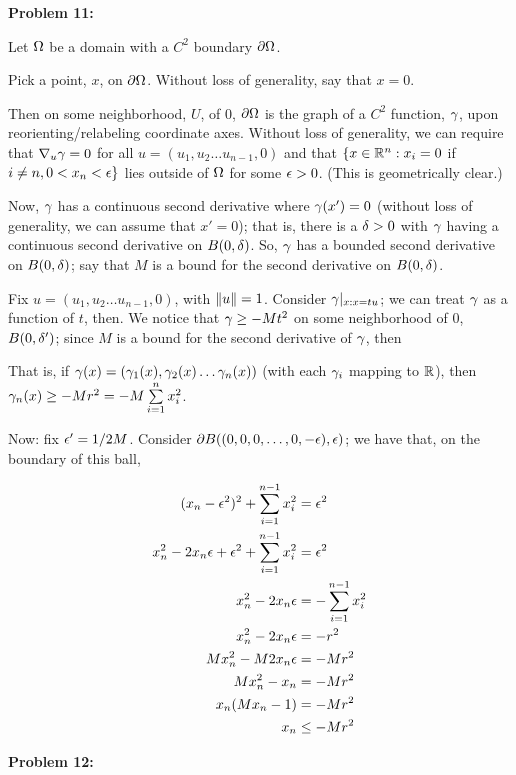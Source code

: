 \documentclass[a4paper,12pt]{article}
\begin{document}
{\bf Problem 11:} %

Let $\Omega$ be a domain with a $C^2$ boundary $\partial \Omega$.

Pick a point, $x$, on $\partial \Omega$. Without loss of generality, say that $x = 0$.

Then on some neighborhood, $U$, of $0$, $\partial \Omega$ is the graph of a $C^2$ function, $\gamma$, upon reorienting/relabeling coordinate axes. Without loss of generality, we can require that $\nabla_u \gamma = 0$ for all $u= (u_1,u_2 \ldots u_{n-1},0)$ and that $\{x \in \mathbb{R}^n: x_i = 0$ if $i \neq n, 0<x_n<\epsilon\}$ lies outside of $\Omega$ for some $\epsilon>0$. (This is geometrically clear.) 

Now, $\gamma$ has a continuous second derivative where $\gamma(x') = 0$ (without loss of generality, we can assume that $x'=0$); that is, there is a $\delta>0$ with $\gamma$ having a continuous second derivative on $B(0,\delta)$. So, $\gamma$ has a bounded second derivative on $B(0,\delta)$; say that $M$ is a bound for the second derivative on $B(0,\delta)$.

Fix $u= (u_1,u_2 \ldots u_{n-1},0)$, with $\|u\| = 1$. Consider $\gamma \vert_{x: x = tu}$; we can treat $\gamma$ as a function of $t$, then. We notice that $\gamma \geq -Mt^2$ on some neighborhood of $0$, $B(0, \delta')$; since $M$ is a bound for the second derivative of $\gamma$, then %

That is, if $\gamma(x) = (\gamma_1(x), \gamma_2(x) \ldots \gamma_n(x))$ (with each $\gamma_i$ mapping to $\mathbb{R}$), then $\gamma_n(x) \geq -Mr^2 = -M \sum\limits_{i=1}^n x_i^2$. %

Now: fix $\epsilon' = 1/2M$. Consider $\partial B((0,0,0,\ldots,0,-\epsilon),\epsilon)$; we have that, on the boundary of this ball,

\begin{align*}
(x_n-\epsilon^2)^2 + \sum\limits_{i=1}^{n-1} x_i^2 &= \epsilon^2\\
x_n^2 -2x_n\epsilon +\epsilon^2 + \sum\limits_{i=1}^{n-1} x_i^2 &= \epsilon^2\\
x_n^2 -2x_n\epsilon &=-\sum\limits_{i=1}^{n-1} x_i^2\\
x_n^2 -2x_n\epsilon &=-r^2\\
Mx_n^2 -M2x_n\epsilon &=-Mr^2\\
Mx_n^2 -x_n &=-Mr^2\\
x_n(Mx_n-1) &=-Mr^2\\
x_n &\leq -Mr^2\\
\end{align*} %

\shunt

{\bf Problem 12:}

\shunt
\end{document}
